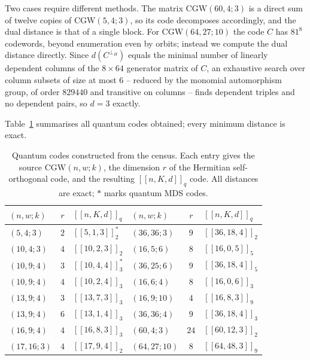 \documentclass{article}
\theoremstyle{definition}
\theoremstyle{remark}
\newcommand{\CGW}{\mathrm{CGW}}
\begin{document}
Two cases require different methods.  The matrix $\CGW(60,4;3)$ is a direct sum of
twelve copies of $\CGW(5,4;3)$, so its code decomposes accordingly, and the dual
distance is that of a single block.  For $\CGW(64,27;10)$ the code $C$ has
$81^8$ codewords, beyond enumeration even by orbits; instead we compute the dual
distance directly.  Since $d(C^{\perp_H})$ equals the minimal number of linearly
dependent columns of the $8 \times 64$ generator matrix of $C$, an exhaustive
search over column subsets of size at most $6$ -- reduced by the monomial
automorphism group, of order $829440$ and transitive on columns -- finds
dependent triples and no dependent pairs, so $d = 3$ exactly.

Table~\ref{tab:qcodes} summarises all quantum codes obtained; every minimum
distance is exact.

\begin{table}[H]
\centering
\small
\caption{Quantum codes constructed from the census.  Each entry gives the
source $\CGW(n,w;k)$, the dimension $r$ of the Hermitian self-orthogonal
code, and the resulting $[[n,K,d]]_q$ code.  All distances are exact;
$*$ marks quantum MDS codes.}
\label{tab:qcodes}
\renewcommand{\arraystretch}{1.15}
\begin{tabular}{lcl@{\qquad}lcl}
\hline
$(n,w;k)$ & $r$ & $[[n,K,d]]_q$ & $(n,w;k)$ & $r$ & $[[n,K,d]]_q$ \\
\hline
$(5,4;3)$   & $2$ & $[[5,1,3]]_2^{*}$   & $(36,36;3)$  & $9$  & $[[36,18,4]]_2$ \\
$(10,4;3)$  & $4$ & $[[10,2,3]]_2$      & $(16,5;6)$   & $8$  & $[[16,0,5]]_5$ \\
$(10,9;4)$  & $3$ & $[[10,4,4]]_3^{*}$  & $(36,25;6)$  & $9$  & $[[36,18,4]]_5$ \\
$(10,9;4)$  & $4$ & $[[10,2,4]]_3$      & $(16,6;4)$   & $8$  & $[[16,0,6]]_3$ \\
$(13,9;4)$  & $3$ & $[[13,7,3]]_3$      & $(16,9;10)$  & $4$  & $[[16,8,3]]_9$ \\
$(13,9;4)$  & $6$ & $[[13,1,4]]_3$      & $(36,36;4)$  & $9$  & $[[36,18,4]]_3$ \\
$(16,9;4)$  & $4$ & $[[16,8,3]]_3$      & $(60,4;3)$   & $24$ & $[[60,12,3]]_2$ \\
$(17,16;3)$ & $4$ & $[[17,9,4]]_2$      & $(64,27;10)$ & $8$  & $[[64,48,3]]_9$ \\
\hline
\end{tabular}
\end{table}
\end{document}
